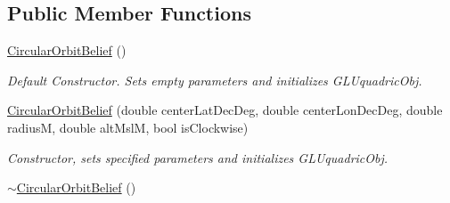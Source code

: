 \subsection*{Public Member Functions}
\begin{DoxyCompactItemize}
\item 
\hypertarget{class_circular_orbit_belief_af62a5aec1370f834de4b2a27e3dd02d9}{
\hyperlink{class_circular_orbit_belief_af62a5aec1370f834de4b2a27e3dd02d9}{CircularOrbitBelief} ()}
\label{class_circular_orbit_belief_af62a5aec1370f834de4b2a27e3dd02d9}

\begin{DoxyCompactList}\small\item\em Default Constructor. Sets empty parameters and initializes GLUquadricObj. \end{DoxyCompactList}\item 
\hyperlink{class_circular_orbit_belief_ae3eb54916ef66940a6b326a68de3d2e4}{CircularOrbitBelief} (double centerLatDecDeg, double centerLonDecDeg, double radiusM, double altMslM, bool isClockwise)
\begin{DoxyCompactList}\small\item\em Constructor, sets specified parameters and initializes GLUquadricObj. \end{DoxyCompactList}\item 
\hypertarget{class_circular_orbit_belief_afed003d6a62dac861108ddaf396e3f2d}{
\hyperlink{class_circular_orbit_belief_afed003d6a62dac861108ddaf396e3f2d}{$\sim$CircularOrbitBelief} ()}
\label{class_circular_orbit_belief_afed003d6a62dac861108ddaf396e3f2d}


\end{DoxyCompactItemize}
